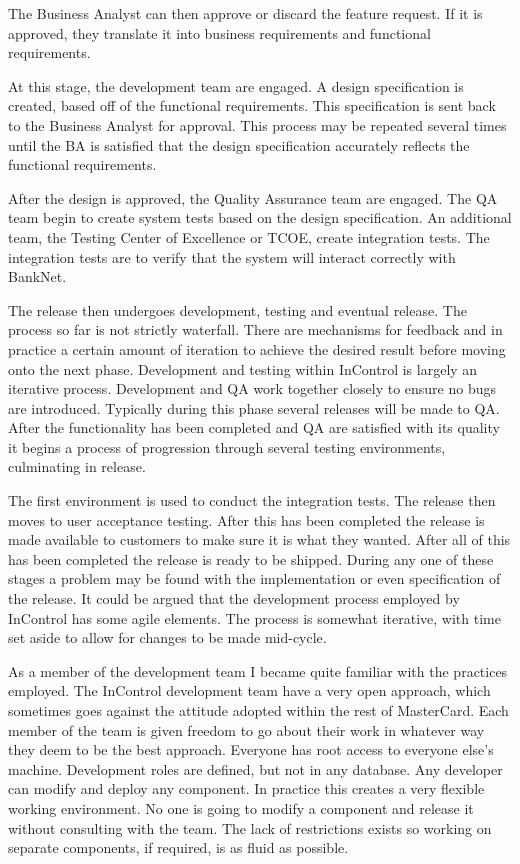 \documentclass[a4paper, 11pt, titlepage]{article}
\begin{document}
The Business Analyst can then approve or discard the feature request. If it is approved, they translate it into business requirements and functional requirements.

At this stage, the development team are engaged. A design specification is created, based off of the functional requirements. This specification is sent back to the Business Analyst for approval. This process may be repeated several times until the BA is satisfied that the design specification accurately reflects the functional requirements.

After the design is approved, the Quality Assurance team are engaged. The QA team begin to create system tests based on the design specification. An additional team, the Testing Center of Excellence or TCOE, create integration tests. The integration tests are to verify that the system will interact correctly with BankNet.

The release then undergoes development, testing and eventual release. The process so far is not strictly waterfall. There are mechanisms for feedback and in practice a certain amount of iteration to achieve the desired result before moving onto the next phase. Development and testing within InControl is largely an iterative process. Development and QA work together closely to ensure no bugs are introduced. Typically during this phase several releases will be made to QA. After the functionality has been completed and QA are satisfied with its quality it begins a process of progression through several testing environments, culminating in release.

\label{release_environments}
The first environment is used to conduct the integration tests. The release then moves to user acceptance testing. After this has been completed the release is made available to customers to make sure it is what they wanted. After all of this has been completed the release is ready to be shipped. During any one of these stages a problem may be found with the implementation or even specification of the release. It could be argued that the development process employed by InControl has some agile elements. The process is somewhat iterative, with time set aside to allow for changes to be made mid-cycle.

\label{dev}
As a member of the development team I became quite familiar with the practices employed. The InControl development team have a very open approach, which sometimes goes against the attitude adopted within the rest of MasterCard. Each member of the team is given freedom to go about their work in whatever way they deem to be the best approach. Everyone has root access to everyone else's machine. Development roles are defined, but not in any database. Any developer can modify and deploy any component. In practice this creates a very flexible working environment. No one is going to modify a component and release it without consulting with the team. The lack of restrictions exists so working on separate components, if required, is as fluid as possible. 
\end{document}
